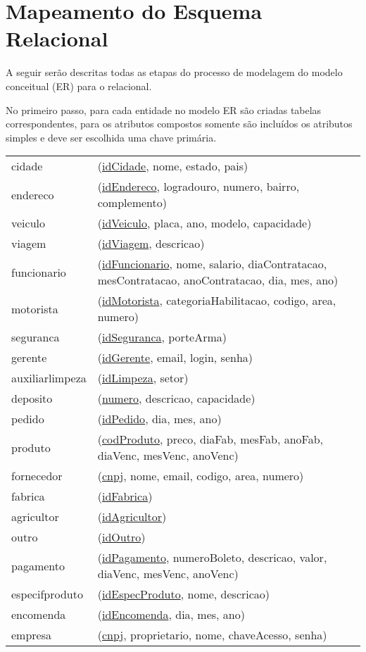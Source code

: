 \documentclass[12pt, onecolumn, titlepage]{article}
\begin{document}
\newpage
\section{Mapeamento do Esquema Relacional}
A seguir serão descritas todas as etapas do processo de modelagem do modelo conceitual (ER) para o relacional.

No primeiro passo, para cada entidade no modelo ER são criadas tabelas correspondentes, para os atributos compostos somente são incluídos os atributos simples e deve ser escolhida uma chave primária.
\\
\renewcommand{\baselinestretch}{1.2}
\begin{table}[htb!]
\begin{center}
\begin{tabular}{p{2.5cm} p{10.5cm}}
cidade & (\underline{idCidade}, nome, estado, pais) \\
endereco & (\underline{idEndereco}, logradouro, numero, bairro, complemento) \\
veiculo & (\underline{idVeiculo}, placa, ano, modelo, capacidade) \\
viagem & (\underline{idViagem}, descricao) \\
funcionario & (\underline{idFuncionario}, nome, salario, diaContratacao, mesContratacao, anoContratacao, dia, mes, ano)\\
motorista & (\underline{idMotorista}, categoriaHabilitacao, codigo, area, numero)\\
seguranca & (\underline{idSeguranca}, porteArma)\\
gerente & (\underline{idGerente}, email, login, senha)\\
auxiliarlimpeza & (\underline{idLimpeza}, setor)\\
deposito & (\underline{numero}, descricao, capacidade)\\
pedido & (\underline{idPedido}, dia, mes, ano)\\
produto & (\underline{codProduto}, preco, diaFab, mesFab, anoFab, diaVenc, mesVenc, anoVenc)\\
fornecedor & (\underline{cnpj}, nome, email, codigo, area, numero)\\
fabrica & (\underline{idFabrica})\\
agricultor & (\underline{idAgricultor})\\
outro & (\underline{idOutro})\\
pagamento & (\underline{idPagamento}, numeroBoleto, descricao, valor, diaVenc, mesVenc, anoVenc)\\
especifproduto & (\underline{idEspecProduto}, nome, descricao)\\
encomenda & (\underline{idEncomenda}, dia, mes, ano)\\
empresa & (\underline{cnpj}, proprietario, nome, chaveAcesso, senha)
\end{tabular}
\end{center}
\end{table}
\end{document}
